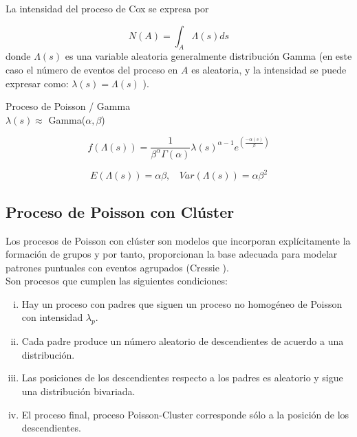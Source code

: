 \documentclass[12pt]{report}
\begin{document}
			
			
			La intensidad  del proceso de Cox se expresa por 
			
			\[  N(A) = \int_{A} \Lambda(s)ds \] donde  $ \Lambda(s) $ es una variable aleatoria generalmente distribución Gamma (en este caso el número de eventos   del proceso en $A$ es aleatoria, y la intensidad se puede expresar como:  $\lambda(s)  =  \Lambda(s)$ ).\\
			
			{\bf {Proceso de Poisson / Gamma\\
					
					$ \lambda(s) \approx $ Gamma($\alpha, \beta $)
					
					\[ f( \Lambda(s) )  =   \frac{ 1  }{  \beta^{\alpha} \Gamma( \alpha )  } \lambda(s)^{\alpha -1} e^{( \frac{-\alpha(s)}{\beta} )}  \]
					
					
					\[ E ( \Lambda(s) )  = \alpha  \beta,  \: \:  \: \:  Var( \Lambda(s) )  = \alpha  \beta^{2}    \]    }}
			
			
			
			
			
			
			\subsection{Proceso de Poisson con  Clúster}{ \label{Pcluster1} }
			
			
			Los procesos de Poisson con clúster son modelos que incorporan explícitamente la formación de grupos y por tanto, proporcionan la base adecuada para modelar patrones
			puntuales con eventos agrupados (Cressie \cite{Cress}).\\
			
			
			Son procesos que cumplen las siguientes condiciones:
			
			
			\begin{enumerate}[i.-]
				
				\item  Hay un proceso con padres  que siguen un proceso no homogéneo de Poisson con intensidad $ \lambda_{p}$.
				
				\item  Cada padre produce un número aleatorio de descendientes de acuerdo a una
				distribución.
				
				\item  Las posiciones de los descendientes respecto a los padres es aleatorio y sigue una
				distribución bivariada.
				
				\item  El proceso final,  proceso Poisson-Cluster corresponde sólo a la  posición de los descendientes.
				
			\end{enumerate}
			
\end{document}

